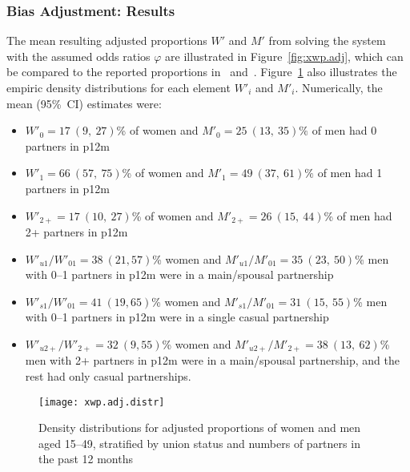\subsubsection{Bias Adjustment: Results}\label{mod.par.wp.res}
The mean resulting adjusted proportions $W'$ and $M'$
from solving the system with the assumed odds ratios $\varphi$
are illustrated in Figure~\ref{fig:xwp.adj}, which can be compared to
the reported proportions in ~and~.
Figure~\ref{fig:xwp.adj.dens} also illustrates the empiric density distributions
for each element $W'_{i}$ and $M'_{i}$.
Numerically, the mean (95\%~CI) estimates were:
\begin{itemize}
  \item $W'_{0} = 17~(9,~27)$\% of women and $M'_{0} = 25~(13,~35)\%$ of men had 0 partners in p12m
  \item $W'_{1} = 66~(57,~75)$\% of women and $M'_{1} = 49~(37,~61)\%$ of men had 1 partners in p12m
  \item $W'_{2+} = 17~(10,~27)$\% of women and $M'_{2+} = 26~(15,~44)$\% of men had 2+ partners in p12m
  \item $W'_{u1} / W'_{01} = 38~(21,57)$\% women and $M'_{u1} / M'_{01} = 35~(23,~50)$\% men
    with 0--1 partners in p12m were in a main/spousal partnership
  \item $W'_{s1} / W'_{01} = 41~(19,65)$\% women and $M'_{s1} / M'_{01} = 31~(15,~55)$\% men
    with 0--1 partners in p12m were in a single casual partnership
  \item $W'_{u2+} / W'_{2+} = 32~(9,55)$\% women and $M'_{u2+} / M'_{2+} = 38~(13,~62)$\% men
    with 2+ partners in p12m were in a main/spousal partnership,
    and the rest had only casual partnerships.
\end{itemize}
\begin{figure}
  \centering
  \texttt{[image: xwp.adj.distr]}
  \caption{Density distributions for adjusted proportions of women and men aged 15--49,
    stratified by union status and numbers of partners in the past 12 months}
  \label{fig:xwp.adj.dens}
\end{figure}
